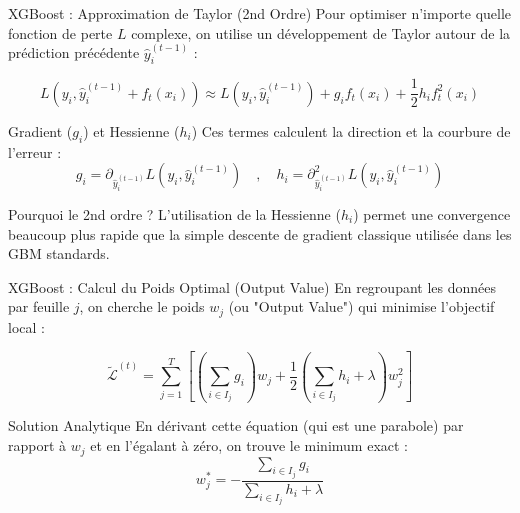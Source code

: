 \begin{frame}{XGBoost : Approximation de Taylor (2nd Ordre)}
    \small
    Pour optimiser n'importe quelle fonction de perte $L$ complexe, on utilise un développement de Taylor autour de la prédiction précédente $\hat{y}_i^{(t-1)}$ :
    
    \[ L(y_i, \hat{y}_i^{(t-1)} + f_t(x_i)) \approx L(y_i, \hat{y}_i^{(t-1)}) + g_i f_t(x_i) + \frac{1}{2} h_i f_t^2(x_i) \]

    \begin{block}{Gradient ($g_i$) et Hessienne ($h_i$)}
        Ces termes calculent la direction et la courbure de l'erreur :
        \[ g_i = \partial_{\hat{y}_i^{(t-1)}} L(y_i, \hat{y}_i^{(t-1)}) \quad , \quad h_i = \partial_{\hat{y}_i^{(t-1)}}^2 L(y_i, \hat{y}_i^{(t-1)}) \]
    \end{block}

    \begin{alertblock}{Pourquoi le 2nd ordre ?}
        L'utilisation de la Hessienne ($h_i$) permet une convergence beaucoup plus rapide que la simple descente de gradient classique utilisée dans les GBM standards.
    \end{alertblock}
\end{frame}

\begin{frame}{XGBoost : Calcul du Poids Optimal (Output Value)}
    \small
    En regroupant les données par feuille $j$, on cherche le poids $w_j$ (ou "Output Value") qui minimise l'objectif local :
    
    \[ \tilde{\mathcal{L}}^{(t)} = \sum_{j=1}^{T} \left[ \left( \sum_{i \in I_j} g_i \right) w_j + \frac{1}{2} \left( \sum_{i \in I_j} h_i + \lambda \right) w_j^2 \right] \]

    \begin{block}{Solution Analytique}
        En dérivant cette équation (qui est une parabole) par rapport à $w_j$ et en l'égalant à zéro, on trouve le minimum exact :
        \[ w_j^* = - \frac{\sum_{i \in I_j} g_i}{\sum_{i \in I_j} h_i + \lambda} \]
    \end{block}

\end{frame}

